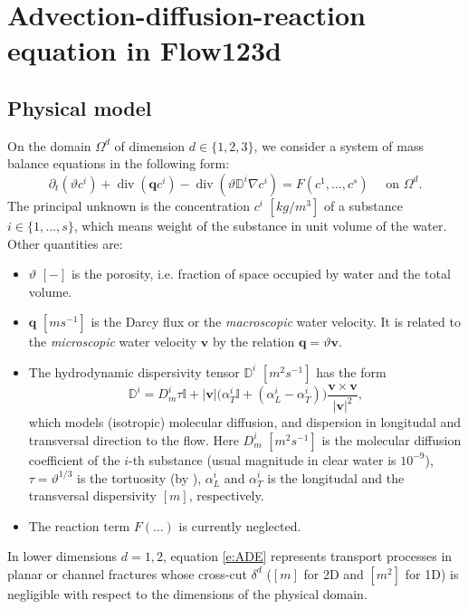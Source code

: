 \documentclass[a4paper]{article}
\def\abs#1{\lvert#1\rvert}
\def\D{{\tn D}}
\def\div{\operatorname{div}}
\def\grad{\nabla}
\def\vc#1{\mathbf{\boldsymbol{#1}}}     %
\def\th{\vartheta}
\def\tn#1{{\mathbb{#1}}}    %
\begin{document}
\section{Advection-diffusion-reaction equation in Flow123d}


\subsection{Physical model}
On the domain $\Omega^d$ of dimension $d\in\{1,2,3\}$, we consider a system of mass balance equations in the following form:
\begin{equation}
    \label{e:ADE}
   \partial_t ( \th c^i) + \div ( \vc q c^i ) - \div (\th \D^i \grad c^i ) = F(c^1,\dots, c^s)  \quad \text{ on } \Omega^d.
\end{equation}
The principal unknown is the concentration $c^i$ $[kg/m^3]$ of a substance $i\in\{1,\dots, s\}$, which means weight of the substance in unit volume of the water.
Other quantities are:
\begin{itemize}
\item $\th$ $[-]$ is the porosity, i.e. fraction of space occupied by water and the total volume.
\item $\vc q$ $[m s^{-1}]$ is the Darcy flux or the \emph{macroscopic} water velocity.
It is related to the \emph{microscopic} water velocity $\vc v$ by the relation $\vc q = \th\vc v$.
\item The hydrodynamic dispersivity tensor $\D^i$ $[m^2 s^{-1}]$ has the form
\[
  \D^i =D_m^i \tau \tn I + \abs{\vc v}\big(\alpha_T^i \tn I + (\alpha_L^i - \alpha_T^i) \big) \frac{\vc v \times \vc v}{\abs{\vc v}^2},
\]
which models (isotropic) molecular diffusion, and dispersion in longitudal and transversal direction to the flow.
Here $D_m^i$ $[m^2 s^{-1}]$ is the molecular diffusion coefficient of the $i$-th substance (usual magnitude in clear water is $10^{-9}$), $\tau=\th^{1/3}$ is the tortuosity (by \cite{millington_quirk}), $\alpha_L^i$ and $\alpha_T^i$ is the longitudal and the transversal dispersivity $[m]$, respectively.

\item The reaction term $F(\dots)$ is currently neglected.
\end{itemize}


In lower dimensions $d=1,2$, equation \eqref{e:ADE} represents transport processes in planar or channel fractures whose cross-cut $\delta^d$ ($[m]$ for 2D and $[m^2]$ for 1D) is negligible with respect to the dimensions of the physical domain.
\end{document}
